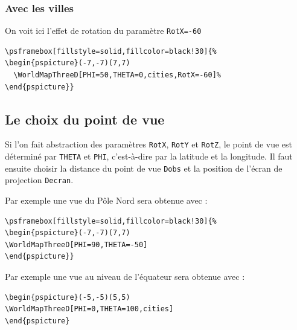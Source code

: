\documentclass[11pt,french,BCOR10mm,DIV12,bibliography=totoc,parskip=false,
   smallheadings, headexclude,footexclude,oneside]{pst-doc}
\begin{document}
\clearpage

\subsubsection{Avec les villes}
On voit ici l'effet de rotation du paramètre \verb+RotX=-60+
\begin{verbatim}
\psframebox[fillstyle=solid,fillcolor=black!30]{%
\begin{pspicture}(-7,-7)(7,7)
  \WorldMapThreeD[PHI=50,THETA=0,cities,RotX=-60]%
\end{pspicture}}
\end{verbatim}

\clearpage

\subsection{Le choix du point de vue}
Si l'on fait abstraction des paramètres \verb+RotX+, \verb+RotY+
et \verb+RotZ+, le point de vue est déterminé par \verb+THETA+ et
\verb+PHI+, c'est-à-dire par la latitude et la longitude. Il faut
ensuite choisir la distance du point de vue \verb+Dobs+ et la position de
l'écran de projection \verb+Decran+.

Par exemple une vue du Pôle Nord sera obtenue avec :
\begin{verbatim}
\psframebox[fillstyle=solid,fillcolor=black!30]{%
\begin{pspicture}(-7,-7)(7,7)
\WorldMapThreeD[PHI=90,THETA=-50]
\end{pspicture}}
\end{verbatim}


\clearpage

Par exemple une vue au niveau de l'équateur sera obtenue avec :
\begin{verbatim}
\begin{pspicture}(-5,-5)(5,5)
\WorldMapThreeD[PHI=0,THETA=100,cities]
\end{pspicture}
\end{verbatim}
\end{document}
